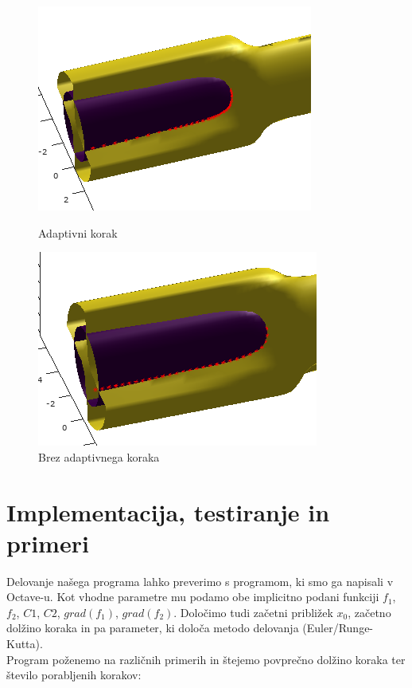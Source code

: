 \documentclass[12pt]{article}
\begin{document}
	\begin{figure}[H]
        \centering
        \begin{minipage}{.5\textwidth}
            \centering
    	    \includegraphics[scale=0.50]{slikaAda}
	        \caption{Adaptivni korak}
    	    \label{slika:slikaAda}
        \end{minipage}%
        \begin{minipage}{.5\textwidth}
            \centering
    	    \includegraphics[scale=0.50]{slikaAda2}
	        \caption{Brez adaptivnega koraka}
    	    \label{slika:slikaAda2}
        \end{minipage}
    \end{figure}		
    
\section{Implementacija, testiranje in primeri}
	Delovanje našega programa lahko preverimo s programom, ki smo ga napisali v Octave-u. Kot vhodne parametre mu podamo obe implicitno podani funkciji $f_{1}$, $f_{2}$, $C1$, $C2$, $grad(f_{1})$, $grad(f_{2})$. Določimo tudi začetni približek $x_{0}$, začetno dolžino koraka in pa parameter, ki določa metodo delovanja (Euler/Runge-Kutta).\\
	Program poženemo na različnih primerih in štejemo povprečno dolžino koraka ter število porabljenih korakov:\\\\
		
\end{document}
